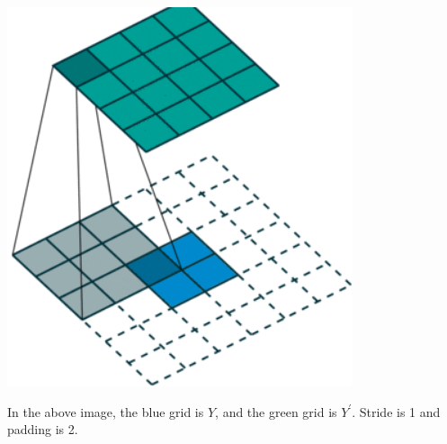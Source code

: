 \documentclass{article}
\begin{document}
\begin{center}
\includegraphics[scale=0.5]{deconv}
\end{center}
In the above image, the blue grid is $Y$, and the green grid is $Y^\prime$. Stride is 1 and padding is 2.
\end{document}
